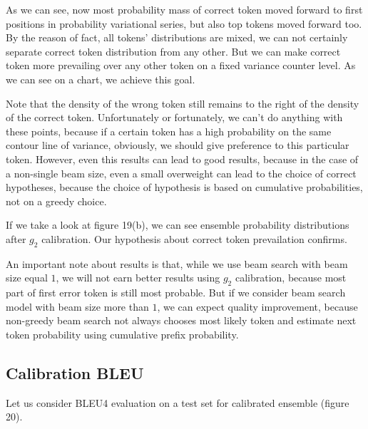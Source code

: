 \documentclass[a4paper,14pt]{extarticle}
\begin{document}
	As we can see, now most probability mass of correct token moved forward to first positions in probability variational series, but also top tokens moved forward too. By the reason of fact, all tokens' distributions are mixed, we can not certainly separate correct token distribution from any other. But we can make correct token more prevailing over any other token on a fixed variance counter level. As we can see on a chart, we achieve this goal.
	
	Note that the density of the wrong token still remains to the right of the density of the correct token. Unfortunately or fortunately, we can't do anything with these points, because if a certain token has a high probability on the same contour line of variance, obviously, we should give preference to this particular token. However, even this results can lead to good results, because in the case of a non-single beam size, even a small overweight can lead to the choice of correct hypotheses, because the choice of hypothesis is based on cumulative probabilities, not on a greedy choice.
	
	If we take a look at figure 19(b), we can see ensemble probability distributions after $g_2$ calibration. Our hypothesis about correct token prevailation confirms.
	
	An important note about results is that, while we use beam search with beam size equal $1$, we will not earn better results using $g_2$ calibration, because most part of first error token is still most probable. But if we consider beam search model with beam size more than $1$, we can expect quality improvement, because non-greedy beam search not always chooses most likely token and estimate next token probability using cumulative prefix probability.

\subsection{Calibration BLEU}
	Let us consider BLEU4 evaluation on a test set for calibrated ensemble (figure 20).
	
\end{document}
